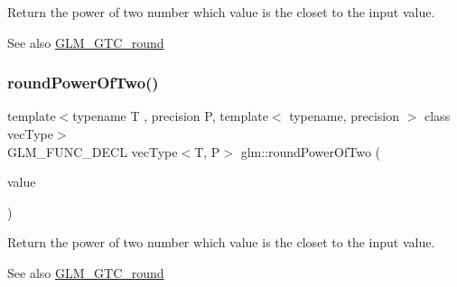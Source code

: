 Return the power of two number which value is the closet to the input value.

\begin{DoxySeeAlso}{See also}
\hyperlink{group__gtc__round}{G\+L\+M\+\_\+\+G\+T\+C\+\_\+round} 
\end{DoxySeeAlso}
\mbox{\label{group__gtc__round_gae95be3b384f3bbd00c6c1cf0a1f96485}} 
\subsubsection{\texorpdfstring{round\+Power\+Of\+Two()}{roundPowerOfTwo()}\hspace{0.1cm}{\footnotesize\ttfamily [2/2]}}
{\footnotesize\ttfamily template$<$typename T , precision P, template$<$ typename, precision $>$ class vec\+Type$>$ \\
G\+L\+M\+\_\+\+F\+U\+N\+C\+\_\+\+D\+E\+CL vec\+Type$<$T, P$>$ glm\+::round\+Power\+Of\+Two (\begin{DoxyParamCaption}\item[{vec\+Type$<$ T, P $>$ const \&}]{value }\end{DoxyParamCaption})}

Return the power of two number which value is the closet to the input value.

\begin{DoxySeeAlso}{See also}
\hyperlink{group__gtc__round}{G\+L\+M\+\_\+\+G\+T\+C\+\_\+round} 
\end{DoxySeeAlso}
